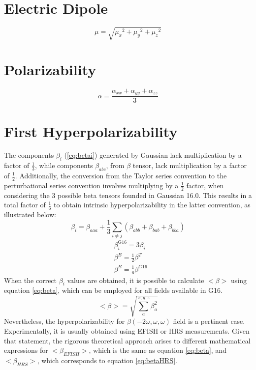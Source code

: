 \documentclass{article}
\begin{document}
	\section{Electric Dipole}
	\begin{equation}\label{eq:DipoleMoment}
	\mu = \sqrt{{\mu_x}^2+{\mu_y}^2+{\mu_z}^2}
	\end{equation}
	
	\section{Polarizability}
	\begin{equation}\label{eq:alpha}
	\alpha = \frac{{\alpha_{xx}} + {\alpha_{yy}} + {\alpha_{zz}}}{3} 
	\end{equation}
	
	\section{First Hyperpolarizability}
	The components $\beta_i$ (\ref{eq:betai}) generated by Gaussian lack multiplication by a factor of $\frac{1}{3}$, while components $\beta_{abc}$, from $\beta$ tensor, lack multiplication by a factor of $\frac{1}{2}$. Additionally, the conversion from the Taylor series convention to the perturbational series convention involves multiplying by a $\frac{1}{2}$ factor, when considering the 3 possible beta tensors founded in Gaussian 16.0. This results in a total factor of $\frac{1}{6}$ to obtain intrinsic hyperpolarizability in the latter convention, as illustrated below:
	\begin{equation}\label{eq:betai}
	\beta_i = \beta_{aaa}+\frac {1}{3}\sum_{i\neq j}(\beta_{abb}+\beta_{bab}+\beta_{bba})
	\end{equation}
	\begin{align*}
	&\beta_i^{\text{G16}} = 3\beta_i \\
	&\beta^{B} = \frac{1}{2} \beta^{T} \\
	&\beta^{B} =  \frac{1}{6}\beta^{G16}
	\end{align*}
	When the correct $\beta_i$ values are obtained, it is possible to calculate $<\beta>$ using equation \ref{eq:beta}, which can be employed for all fields available in G16.
	\begin{equation}\label{eq:beta}
	<\beta>=\sqrt{\sum_{a}^{x,y,z}\beta^{2}_{a}}
	\end{equation}
	Nevertheless, the hyperpolarizability for $\beta(-2\omega , \omega , \omega)$ field is a pertinent case. Experimentally, it is usually obtained using EFISH or HRS measurements. Given that statement, the rigorous theoretical approach arises to different mathematical expressions for $<\beta_{EFISH}>$, which is the same as equation \ref{eq:beta}, and $<\beta_{HRS}>$, which corresponds to equation \ref{eq:betaHRS}. 
	
\end{document}
